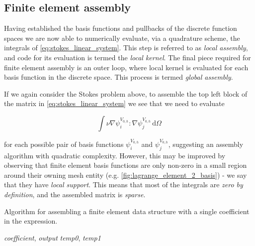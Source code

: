 \documentclass[thesis]{subfiles}
\begin{document}
\subsection{Finite element assembly}

Having established the basis functions and pullbacks of the discrete function spaces we are now able to numerically evaluate, via a quadrature scheme, the integrals of \cref{eq:stokes_linear_system}.
This step is referred to as \textit{local assembly}, and code for its evaluation is termed the \textit{local kernel}.
The final piece required for finite element assembly is an outer loop, where local kernel is evaluated for each basis function in the discrete space.
This process is termed \textit{global assembly}.

If we again consider the Stokes problem above, to assemble the top left block of the matrix in \cref{eq:stokes_linear_system} we see that we need to evaluate

\begin{equation}
  \int \nu \nabla \psi^{V_{0,h}}_i : \nabla \psi^{V_{0,h}}_j \, \textrm{d}\Omega
  \label{eq:stokes_top_left}
\end{equation}

\noindent
for each possible pair of basis functions $\psi^{V_{0,h}}_i$ and $\psi^{V_{0,h}}_j$, suggesting an assembly algorithm with quadratic complexity.
However, this may be improved by observing that finite element basis functions are only non-zero in a small region around their owning mesh entity (e.g. \cref{fig:lagrange_element_2_basis}) - we say that they have \textit{local support}.
This means that most of the integrals are \textit{zero by definition}, and the assembled matrix is \textit{sparse}.

\begin{algorithm}
  \caption{
    Algorithm for assembling a finite element data structure with a single coefficient in the expression.
  }
  \begin{algorithmic}[1]
    \Require \textit{coefficient}, \textit{output} 
    \Require \textit{temp0}, \textit{temp1} 

      \State {}\label{code:pack_demo}
      \State {}
      \State {} 
      \State {} \label{code:unpack_demo}
    \EndFor
  \end{algorithmic}
  \label{alg:fem_assembly}
\end{algorithm}
\end{document}
